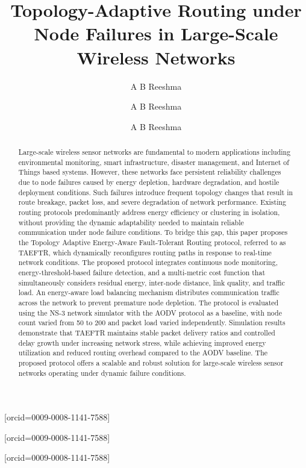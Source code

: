\documentclass[a4paper,fleqn]{cas-dc}
\numberwithin{equation}{section}
\begin{document}
\let\WriteBookmarks\relax
\def\floatpagepagefraction{1}
\def\textpagefraction{.001}


\title [mode = title]{Topology-Adaptive Routing under Node Failures in 
Large-Scale Wireless Networks}      



\author[1]{A B Reeshma}[orcid=0009-0008-1141-7588]
\address[1]{School of Computer Science and Engineering, VIT-AP University, Amaravathi. Andhra Pradesh, India}


\author[2]{A B Reeshma} [orcid=0009-0008-1141-7588]
\cormark[1]


\author[3]{A B Reeshma} [orcid=0009-0008-1141-7588]



\begin{abstract}
Large-scale wireless sensor networks are fundamental to modern applications including environmental monitoring, smart infrastructure, disaster management, and Internet of Things based systems. However, these networks face persistent reliability challenges due to node failures caused by energy depletion, hardware degradation, and hostile deployment conditions. Such failures introduce frequent topology changes that result in route breakage, packet loss, and severe degradation of network performance. Existing routing protocols predominantly address energy efficiency or clustering in isolation, without providing the dynamic adaptability needed to maintain reliable communication under node failure conditions. To bridge this gap, this paper proposes the Topology Adaptive Energy-Aware Fault-Tolerant Routing protocol, referred to as TAEFTR, which dynamically reconfigures routing paths in response to real-time network conditions. The proposed protocol integrates continuous node monitoring, energy-threshold-based failure detection, and a multi-metric cost function that simultaneously considers residual energy, inter-node distance, link quality, and traffic load. An energy-aware load balancing mechanism distributes communication traffic across the network to prevent premature node depletion. The protocol is evaluated using the NS-3 network simulator with the AODV protocol as a baseline, with node count varied from 50 to 200 and packet load varied independently. Simulation results demonstrate that TAEFTR maintains stable packet delivery ratios and controlled delay growth under increasing network stress, while achieving improved energy utilization and reduced routing overhead compared to the AODV baseline. The proposed protocol offers a scalable and robust solution for large-scale wireless sensor networks operating under dynamic failure conditions.

\end{abstract}
\end{document}
